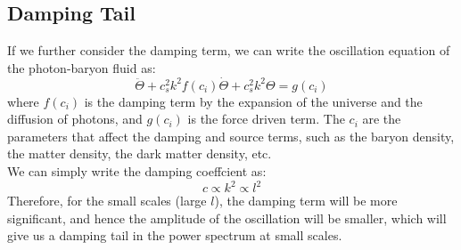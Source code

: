 \subsection{Damping Tail}
\begin{intuition}
    If we further consider the damping term, we can write the oscillation equation of the photon-baryon fluid as:
    \[
        \ddot{\Theta} + c_s^2 k^2 f(c_i) \dot{\Theta} + c_s^2 k^2 \Theta = g(c_i)
    \]
    where $f(c_i)$ is the damping term by the expansion of the universe and the diffusion of photons, and $g(c_i)$ is the force driven term. The $c_i$ are the parameters that affect the damping and source terms, such as the baryon density, the matter density, the dark matter density, etc. \\

    We can simply write the damping coeffcient as:
    \[
        c \propto k^2 \propto l^2
    \]
    Therefore, for the small scales (large $l$), the damping term will be more significant, and hence the amplitude of the oscillation will be smaller, which will give us a damping tail in the power spectrum at small scales.
\end{intuition}

